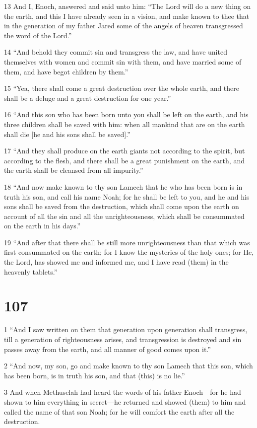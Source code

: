 \par 13 And I, Enoch, answered and said unto him: “The Lord will do a new thing on the earth, and this I have already seen in a vision, and make known to thee that in the generation of my father Jared some of the angels of heaven transgressed the word of the Lord.”
\par 14 “And behold they commit sin and transgress the law, and have united themselves with women and commit sin with them, and have married some of them, and have begot children by them.”
\par 15 “Yea, there shall come a great destruction over the whole earth, and there shall be a deluge and a great destruction for one year.”
\par 16 “And this son who has been born unto you shall be left on the earth, and his three children shall be saved with him: when all mankind that are on the earth shall die [he and his sons shall be saved].”
\par 17 “And they shall produce on the earth giants not according to the spirit, but according to the flesh, and there shall be a great punishment on the earth, and the earth shall be cleansed from all impurity.”
\par 18 “And now make known to thy son Lamech that he who has been born is in truth his son, and call his name Noah; for he shall be left to you, and he and his sons shall be saved from the destruction, which shall come upon the earth on account of all the sin and all the unrighteousness, which shall be consummated on the earth in his days.”
\par 19 “And after that there shall be still more unrighteousness than that which was first consummated on the earth; for I know the mysteries of the holy ones; for He, the Lord, has showed me and informed me, and I have read (them) in the heavenly tablets.”

\chapter{107}

\par 1 “And I saw written on them that generation upon generation shall transgress, till a generation of righteousness arises, and transgression is destroyed and sin passes away from the earth, and all manner of good comes upon it.”
\par 2 “And now, my son, go and make known to thy son Lamech that this son, which has been born, is in truth his son, and that (this) is no lie.”
\par 3 And when Methuselah had heard the words of his father Enoch—for he had shown to him everything in secret—he returned and showed (them) to him and called the name of that son Noah; for he will comfort the earth after all the destruction.

